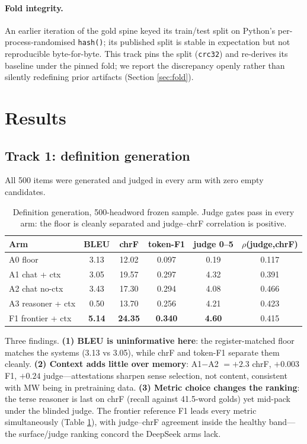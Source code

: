 \documentclass[11pt]{article}
\begin{document}
\paragraph{Fold integrity.} An earlier iteration of the gold spine keyed its train/test
split on Python's per-process-randomised \texttt{hash()}; its published split is stable
in expectation but not reproducible byte-for-byte. This track pins the split
(\texttt{crc32}) and re-derives its baseline under the pinned fold; we report the
discrepancy openly rather than silently redefining prior artifacts (Section
\ref{sec:fold}).

\section{Results}

\subsection{Track 1: definition generation}

All 500 items were generated and judged in every arm with zero empty candidates.

\begin{table}[h]
\centering
\small
\begin{tabular}{lccccc}
\hline
Arm & BLEU & chrF & token-F1 & judge 0--5 & $\rho$(judge,chrF) \\
\hline
A0 floor & 3.13 & 12.02 & 0.097 & 0.19 & 0.117 \\
A1 chat + ctx & 3.05 & 19.57 & 0.297 & 4.32 & 0.391 \\
A2 chat no-ctx & 3.43 & 17.30 & 0.294 & 4.08 & 0.466 \\
A3 reasoner + ctx & 0.50 & 13.70 & 0.256 & 4.21 & 0.423 \\
F1 frontier + ctx & \textbf{5.14} & \textbf{24.35} & \textbf{0.340} & \textbf{4.60} & 0.415 \\
\hline
\end{tabular}
\caption{Definition generation, 500-headword frozen sample. Judge gates pass in every
arm: the floor is cleanly separated and judge--chrF correlation is positive.}
\label{tab:defgen}
\end{table}

Three findings. \textbf{(1) BLEU is uninformative here}: the register-matched floor
matches the systems (3.13 vs 3.05), while chrF and token-F1 separate them cleanly.
\textbf{(2) Context adds little over memory}: A1$-$A2 $= +2.3$ chrF, $+0.003$ F1,
$+0.24$ judge---attestations sharpen sense selection, not content, consistent with MW
being in pretraining data. \textbf{(3) Metric choice changes the ranking}: the terse
reasoner is last on chrF (recall against 41.5-word golds) yet mid-pack under the blinded
judge. The frontier reference F1 leads every metric simultaneously (Table
\ref{tab:defgen}), with judge--chrF agreement inside the healthy band---the
surface/judge ranking concord the DeepSeek arms lack.
\end{document}
